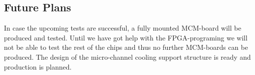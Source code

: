 \subsection{Future Plans}
In case the upcoming tests are successful, a fully mounted MCM-board will be produced and tested.
Until we have got help with the FPGA-programing we will not be able to test the rest of the chips and
thus no further MCM-boards can be produced.
The design of the micro-channel cooling support structure is ready and production is planned.
